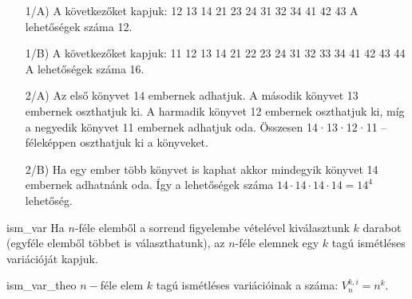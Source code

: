 \begin{solution}
\begin{itemize}
\item[1/A)] A következőket kapjuk: 12 13 14 21 23 24 31 32 34 41 42 43 A
lehetőségek száma 12.
\item[1/B)] A következőket kapjuk: 11 12 13 14 21 22 23 24 31 32 33 34 41
42 43 44 A lehetőségek száma 16.
\item[2/A)] Az első könyvet 14 embernek adhatjuk. A második könyvet 13 embernek
oszthatjuk ki. A harmadik könyvet 12 embernek oszthatjuk ki, míg a
negyedik könyvet 11 embernek adhatjuk oda. Összesen 14·13·12·11 --
féleképpen oszthatjuk ki a könyveket.
\item[2/B)] Ha egy ember több könyvet is kaphat akkor mindegyik könyvet
14 embernek adhatnánk oda. Így a lehetőségek száma $14\cdot14\cdot14\cdot14=14^{4}$
lehetőség.
\end{itemize}

\end{solution}
\begin{definition}{ism_var}
Ha $n$-féle elemből a sorrend figyelembe vételével kiválasztunk $k$
darabot (egyféle elemből többet is választhatunk), az $n$-féle elemnek
egy $k$ tagú ismétléses variációját kapjuk. \cite{Moz2}
\end{definition}

\begin{theorem}{ism_var_theo}
$n-$féle elem $k$ tagú ismétléses variációinak a száma: $V_{n}^{k,i}=n^{k}.$ 
\end{theorem}

